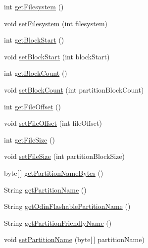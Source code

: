 \begin{DoxyCompactItemize}
\item 
int \hyperlink{classcom_1_1casual__dev_1_1libpit_x_1_1_pit_entry_a14c2a17a34d7a856841c6d4f6a7faa55}{get\-Filesystem} ()
\item 
void \hyperlink{classcom_1_1casual__dev_1_1libpit_x_1_1_pit_entry_af8dcf52b2891cebde21141fe14825776}{set\-Filesystem} (int filesystem)
\item 
int \hyperlink{classcom_1_1casual__dev_1_1libpit_x_1_1_pit_entry_a31268b095a9c0bea62546eb89e52e83c}{get\-Block\-Start} ()
\item 
void \hyperlink{classcom_1_1casual__dev_1_1libpit_x_1_1_pit_entry_ab251367b41dd114c583fd07fce2a9c90}{set\-Block\-Start} (int block\-Start)
\item 
int \hyperlink{classcom_1_1casual__dev_1_1libpit_x_1_1_pit_entry_ab9f5ff4767d583453c99e6e72e8c47ad}{get\-Block\-Count} ()
\item 
void \hyperlink{classcom_1_1casual__dev_1_1libpit_x_1_1_pit_entry_a5103dd7f83f10db5d62412552ee8190f}{set\-Block\-Count} (int partition\-Block\-Count)
\item 
int \hyperlink{classcom_1_1casual__dev_1_1libpit_x_1_1_pit_entry_a568044efde68e55a58325f462c97ef71}{get\-File\-Offset} ()
\item 
void \hyperlink{classcom_1_1casual__dev_1_1libpit_x_1_1_pit_entry_ab5963fd6545122217f0705a2a6437c35}{set\-File\-Offset} (int file\-Offset)
\item 
int \hyperlink{classcom_1_1casual__dev_1_1libpit_x_1_1_pit_entry_a7cb4a7951dffef12cded2030f869ee35}{get\-File\-Size} ()
\item 
void \hyperlink{classcom_1_1casual__dev_1_1libpit_x_1_1_pit_entry_a0697b3bdb48274d6144e312655e303b4}{set\-File\-Size} (int partition\-Block\-Size)
\item 
byte\mbox{[}$\,$\mbox{]} \hyperlink{classcom_1_1casual__dev_1_1libpit_x_1_1_pit_entry_a424a14c5faa950f434360a9bc764fb94}{get\-Partition\-Name\-Bytes} ()
\item 
String \hyperlink{classcom_1_1casual__dev_1_1libpit_x_1_1_pit_entry_a19559e3e0fc28faa5969beb25b605a5e}{get\-Partition\-Name} ()
\item 
String \hyperlink{classcom_1_1casual__dev_1_1libpit_x_1_1_pit_entry_ab976148a74233f1af605e4f2a6d4b2f3}{get\-Odin\-Flashable\-Partition\-Name} ()
\item 
String \hyperlink{classcom_1_1casual__dev_1_1libpit_x_1_1_pit_entry_a2974f9a871aeefec19fbe7416c324249}{get\-Partition\-Friendly\-Name} ()
\item 
void \hyperlink{classcom_1_1casual__dev_1_1libpit_x_1_1_pit_entry_a94a1e4368f5f81cd0ac9c51a3dfaca02}{set\-Partition\-Name} (byte\mbox{[}$\,$\mbox{]} partition\-Name)

\end{DoxyCompactItemize}
